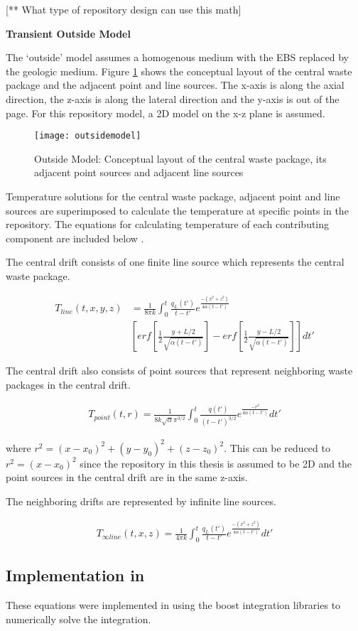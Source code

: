[** What type of repository design can use this math]

\noindent
\textbf{Transient Outside Model}

The `outside' model assumes a homogenous medium with the \gls{EBS} 
replaced by the geologic medium. 
Figure \ref{fig:conceptual_layout} shows the conceptual layout of 
the central waste package and the adjacent point and line sources. 
The x-axis is along the axial direction, the z-axis is along the 
lateral direction and the y-axis is out of the page. 
For this repository model, a 2D model on the x-z plane is assumed. 

\begin{figure}[h]
	\texttt{[image: outsidemodel]}
	\caption{Outside Model: Conceptual layout of the central waste 
	package, its adjacent point sources and adjacent line sources 
	\cite{sutton_investigations_2011}}
    \label{fig:conceptual_layout}
\end{figure}

Temperature solutions for the central waste package, adjacent point
and line sources are superimposed to calculate the temperature at 
specific points in the repository.
The equations for calculating temperature of each contributing 
component are included below \cite{sutton_investigations_2011,
greenberg_application_2012,huff_numerical_2012}. 

The central drift consists of one finite line source which 
represents the central waste package. 

\begin{align}
	T_{line}(t,x,y,z) &= \frac{1}{8 \pi k}  \int_{0}^{t} 
	\frac{q_L(t')}{t-t'}e^{\frac{-(x^2+z^2)}{4\alpha(t-t')}} \\
	&[erf[\frac{1}{2}\frac{y+L/2}{\sqrt{\alpha(t-t')}}]-
	erf[\frac{1}{2}\frac{y-L/2}{\sqrt{\alpha(t-t')}}]] dt'
\end{align}

The central drift also consists of point sources that represent 
neighboring waste packages in the central drift. 

\begin{align}
	T_{point}(t,r) = \frac{1}{8 k \sqrt{\alpha} \pi^{3/2}} 
	\int_{0}^{t}\frac{q(t')}{(t-t')^{3/2}}e^{\frac{-r^2}
	{4\alpha(t-t')}}dt'
\end{align}

where $r^2 = (x-x_0)^2 + (y-y_0)^2 + (z-z_0)^2$. 
This can be reduced to $r^2 = (x-x_0)^2$ since the repository in 
this thesis is assumed to be 2D and the point sources in the central 
drift are in the same z-axis.  

The neighboring drifts are represented by infinite line sources.  

\begin{align}
	T_{\infty line}(t,x,z) = \frac{1}{4\pi k} \int_0^t 
	\frac{q_L(t')}{t-t'} e^{\frac{-(x^2+z^2)}{4\alpha (t-t')}} dt'
\end{align}

\subsection{Implementation in \Cyclus}
These equations were implemented in \Cyclus using the boost 
integration libraries to numerically solve the integration.  
